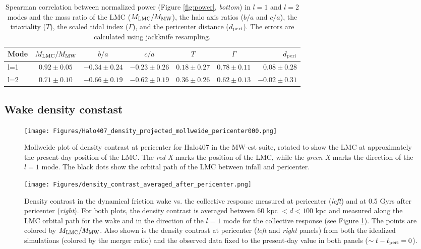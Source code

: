 \documentclass[twocolumn, linenumbers]{openjournal}
\begin{document}
\begin{table*}
\centering
\caption{Spearman correlation between normalized power (Figure \ref{fig:power}, 
\emph{bottom}) in $l=1$ and $l=2$ modes and the mass ratio of the LMC ($M_{\rm LMC}/M_{\rm MW}$), 
the halo axis ratios ($b/a$ and $c/a$), the triaxiality ($T$), the scaled tidal index ($\Gamma$), 
and the pericenter distance ($d_{\rm peri}$). The errors are calculated using jackknife 
resampling.}\label{tab:spearman}
{\begin{tabular}{lcccccr} 
\hline
Mode & $M_{\rm LMC}/M_{\rm MW}$  & $b/a$ & $c/a$ & $T$ & $\Gamma$ & $d_{\rm peri}$ \\ 
\hline
l=1 & $0.92 \pm 0.05$ & $-0.34 \pm 0.24$ & $-0.23 \pm 0.26$ & $0.18 \pm 0.27$ & $0.78 \pm 0.11$ & $0.08 \pm 0.28$  \\
l=2 & $0.71 \pm 0.10 $ & $-0.66 \pm 0.19$ & $-0.62 \pm 0.19$ & $0.36 \pm 0.26$ &  $0.62 \pm 0.13$ & $-0.02 \pm 0.31$  \\
\hline
\end{tabular}}
\end{table*}


\subsection{Wake density constast}


\begin{figure}[h]
    \texttt{[image: Figures/Halo407\_density\_projected\_mollweide\_pericenter000.png]}
    
    \caption[All-Sky Response]{Mollweide plot of density contrast at pericenter for Halo407 in the MW-est suite, rotated to show the LMC at approximately the present-day position of the LMC. The \emph{red X} marks the position of the LMC, while the \emph{green X} marks the direction of the $l=1$ mode. The black dots show the orbital path of the LMC between infall and pericenter.} 
    \label{fig:mollweide}
\end{figure}
    
    
    
\begin{figure*}[h]
    \texttt{[image: Figures/density\_contrast\_averaged\_after\_pericenter.png]}
    
    \caption[Density Contrast Comparison with Observations]{Density contrast in the dynamical friction wake vs. the collective response measured at pericenter (\emph{left}) and at 0.5 Gyrs after 
    pericenter (\emph{right}). For both plots, the density contrast is averaged between $60$ kpc $< d < 100$ kpc and measured along 
    the LMC orbital path for the wake and in the direction of the $l=1$ mode for the collective response (see Figure \ref{fig:mollweide}). The points are colored
    by $M_{\rm LMC}/M_{\rm MW}$. Also shown is the density contrast at pericenter (\emph{left} and \emph{right} panels) from both the idealized simulations \citep{garavito_19} (colored by the 
    merger ratio) and the observed data \citep{Conroy_2021} fixed to the present-day value in both panels ($\sim t-t_{\rm peri} = 0$). } 
    
    \label{fig:density_contrast}
\end{figure*}
    
\end{document}
